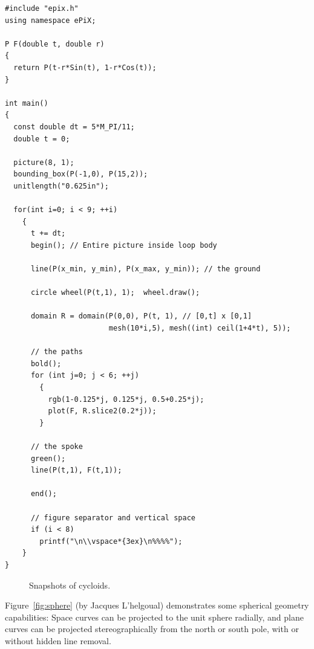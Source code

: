 \documentclass[11pt]{article}
\begin{document}
\begin{small}
\begin{verbatim}
#include "epix.h"
using namespace ePiX;

P F(double t, double r)
{
  return P(t-r*Sin(t), 1-r*Cos(t));
}

int main() 
{
  const double dt = 5*M_PI/11;
  double t = 0;

  picture(8, 1);
  bounding_box(P(-1,0), P(15,2));
  unitlength("0.625in");

  for(int i=0; i < 9; ++i)
    {
      t += dt;
      begin(); // Entire picture inside loop body

      line(P(x_min, y_min), P(x_max, y_min)); // the ground

      circle wheel(P(t,1), 1);  wheel.draw();

      domain R = domain(P(0,0), P(t, 1), // [0,t] x [0,1]
                        mesh(10*i,5), mesh((int) ceil(1+4*t), 5));

      // the paths
      bold();
      for (int j=0; j < 6; ++j)
        {
          rgb(1-0.125*j, 0.125*j, 0.5+0.25*j);
          plot(F, R.slice2(0.2*j));
        }

      // the spoke
      green();
      line(P(t,1), F(t,1));

      end();
    
      // figure separator and vertical space
      if (i < 8)
        printf("\n\\vspace*{3ex}\n%%%%");
    }
}

\end{verbatim}
\end{small}

\vspace*{-100pt}
\begin{figure}[hb]
\begin{center}

\caption{Snapshots of cycloids.}
\label{fig:wheel}
\end{center}
\end{figure}

\clearpage

Figure~\ref{fig:sphere} (by Jacques L'helgoual) demonstrates some
spherical geometry capabilities: Space curves can be projected to the
unit sphere radially, and plane curves can be projected
stereographically from the north or south pole, with or without hidden
line removal.
\end{document}
